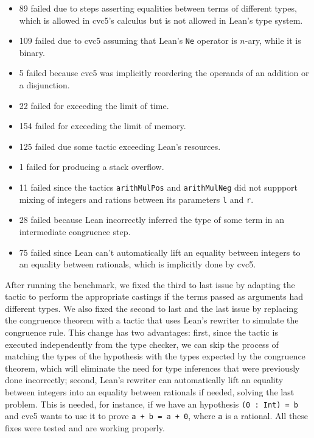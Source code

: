 \begin{itemize}
  \item 89 failed due to steps asserting equalities between terms of different types, which is allowed in cvc5's calculus but is not allowed in Lean's type system.
  \item 109 failed due to cvc5 assuming that Lean's \texttt{Ne} operator is $n$-ary, while it is binary.
  \item 5 failed because cvc5 was implicitly reordering the operands of an addition or a disjunction.
  \item 22 failed for exceeding the limit of time.
  \item 154 failed for exceeding the limit of memory.
  \item 125 failed due some tactic exceeding Lean's resources.
  \item 1 failed for producing a stack overflow.
  \item 11 failed since the tactics \texttt{arithMulPos} and \texttt{arithMulNeg} did not suppport mixing of integers and rations between its parameters \texttt{l} and \texttt{r}.
  \item 28 failed because Lean incorrectly inferred the type of some term in an intermediate congruence step.
  \item 75 failed since Lean can't automatically lift an equality between integers to an equality between rationals, which is implicitly done by cvc5.
\end{itemize}

After running the benchmark, we fixed the third to last issue by adapting the tactic to perform the
appropriate castings if the terms passed as arguments had different types. We also fixed the second to last and the last
issue by replacing the congruence theorem with a tactic that uses Lean's rewriter to simulate the congruence rule.
This change has two advantages: first, since the tactic is executed independently from the type checker, we can skip the process
of matching the types of the hypothesis with the types expected by the congruence theorem, which will
eliminate the need for type inferences that were previously done incorrectly; second, Lean's rewriter
can automatically lift an equality between integers into an equality between rationals if needed, solving
the last problem. This is needed, for instance, if we have an hypothesis \texttt{(0 : Int) = b}
and cvc5 wants to use it to prove \texttt{a + b = a + 0}, where \texttt{a} is a rational. All these
fixes were tested and are working properly.

